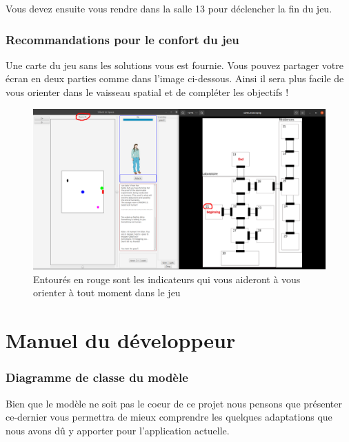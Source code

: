 \documentclass[./standalone.tex]{subfiles}
\begin{document}
Vous devez ensuite vous rendre dans la salle 13 pour déclencher la fin du jeu.


\section{Recommandations pour le confort du jeu}
Une carte du jeu sans les solutions vous est fournie. Vous pouvez partager votre écran en deux parties comme dans l’image ci-dessous. Ainsi il sera plus facile de vous orienter dans le vaisseau spatial et de compléter les objectifs !

\begin{center}
	\begin{figure}[h!]
	\includegraphics[scale=0.24]{images/conseils_utilisation.png}
	\caption{Entourés en rouge sont les indicateurs qui vous aideront à vous orienter à tout moment dans le jeu}
	\end{figure}
\end{center}


\newpage
\part{Manuel du développeur}

\section{Diagramme de classe du modèle}

Bien que le modèle ne soit pas le coeur de ce projet nous pensons que présenter ce-dernier vous permettra de mieux comprendre les quelques adaptations que nous avons dû y apporter pour l'application actuelle.\\
\end{document}
